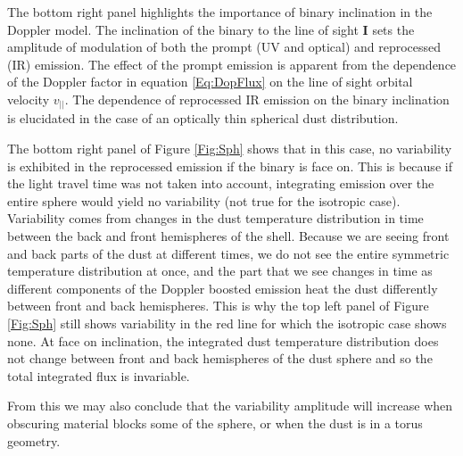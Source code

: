 The bottom right panel highlights the importance of binary inclination in the
Doppler model. The inclination of the binary to the line of sight $\mathbf{I}$
sets the amplitude of modulation of both the prompt (UV and optical) and
reprocessed (IR) emission. The effect of the prompt emission is apparent from
the dependence of the Doppler factor in equation \ref{Eq:DopFlux} on the line
of sight orbital velocity $v_{||}$. The dependence of reprocessed IR emission
on the binary inclination is elucidated in the case of an optically thin
spherical dust distribution. 

The bottom right panel of Figure \ref{Fig:Sph}
shows that in this case, no variability is exhibited in the reprocessed
emission if the binary is face on. This is because if the light travel time
was not taken into account, integrating emission over the entire sphere would
yield no variability (not true for the isotropic case). Variability comes from
changes in the dust temperature distribution in time between the back and
front hemispheres of the shell. Because we are seeing front and back parts of
the dust at different times, we do not see the entire symmetric temperature
distribution at once, and the part that we see changes in time as different
components of the Doppler boosted emission heat the dust differently between
front and back hemispheres. This is why the top left panel of Figure
\ref{Fig:Sph} still shows variability in the red line for which the isotropic
case shows none. At face on inclination, the integrated dust temperature
distribution does not change between front and back hemispheres of the dust
sphere and so the total integrated flux is invariable. 

From this we may also conclude that the variability amplitude will increase
when obscuring material blocks some of the sphere, or when the dust is in a
torus geometry.





